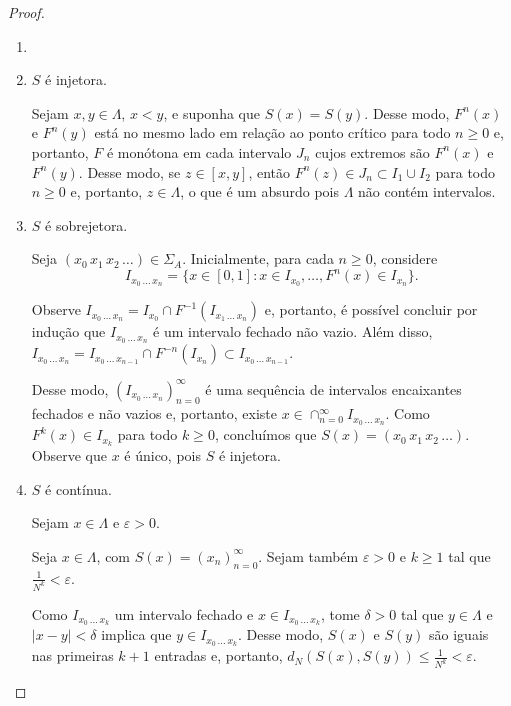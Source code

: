 \begin{proof}

\begin{enumerate}[label=\alph*)]
\item[]
\item $S$ é injetora.

Sejam $x, y \in \Lambda$, $x < y$, e suponha que $S(x) = S(y)$. Desse modo, $F^n(x)$ e $F^n(y)$ está no mesmo lado em relação ao ponto crítico para todo $n \geq 0$ e, portanto, $F$ é monótona em cada intervalo $J_n$ cujos extremos são $F^n(x)$ e $F^n(y)$. Desse modo, se $z \in [x, y]$, então $F^n(z) \in J_n \subset I_1 \cup I_2$ para todo $n \geq 0$ e, portanto, $z \in \Lambda$, o que é um absurdo pois $\Lambda$ não contém intervalos.

\item $S$ é sobrejetora.

Seja $(x_0 \, x_1 \, x_2 \, \dots) \in \Sigma_A$. Inicialmente, para cada $n \geq 0$, considere
$$I_{x_0 \, \dots \, x_n} = \lbrace x \in [0,1] : x \in I_{x_0}, \dots, F^n(x) \in I_{x_n} \rbrace.$$

Observe $I_{x_0 \, \dots \, x_n} = I_{x_0} \cap F^{-1}(I_{x_1 \, \dots \, x_n})$ e, portanto, é possível concluir por indução que $I_{x_0 \, \dots \, x_n}$ é um intervalo fechado não vazio. Além disso, $I_{x_0 \, \dots \, x_n} = I_{x_0 \, \dots \, x_{n-1}} \cap F^{-n}(I_{x_n}) \subset I_{x_0 \, \dots \, x_{n-1}}$.

Desse modo, $(I_{x_0 \, \dots \, x_n})_{n=0}^\infty$ é uma sequência de intervalos encaixantes fechados e não vazios e, portanto, existe $x \in \cap_{n=0}^\infty I_{x_0 \, \dots \, x_n}$. Como $F^k(x) \in I_{x_k}$ para todo $k \geq 0$, concluímos que $S(x) = (x_0 \, x_1 \, x_2 \, \dots)$. Observe que $x$ é único, pois $S$ é injetora.

\item $S$ é contínua.

Sejam $x \in \Lambda$ e $\varepsilon > 0$.

Seja $x \in \Lambda$, com $S(x) = (x_n)_{n=0}^\infty$. Sejam também $\varepsilon > 0$ e $k \geq 1$ tal que $\frac{1}{N^k} < \varepsilon$.

Como $I_{x_0 \, \dots \, x_k}$ um intervalo fechado e $x \in I_{x_0 \, \dots \, x_k}$, tome $\delta > 0$ tal que $y \in \Lambda$ e $|x-y| < \delta$ implica que $y \in I_{x_0 \, \dots \, x_k}$. Desse modo, $S(x)$ e $S(y)$ são iguais nas primeiras $k+1$ entradas e, portanto, $d_N(S(x), S(y)) \leq \frac{1}{N^k} < \varepsilon$.

\end{enumerate}
\end{proof}


